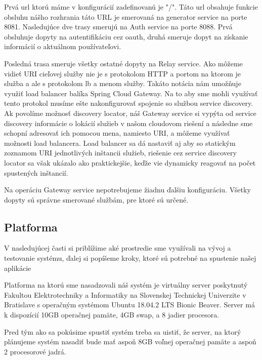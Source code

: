 Prvá \acrshort{url} ktorú máme v konfigurácií zadefinovanú je "/". Táto \acrshort{url} obsahuje funkcie obsluhu nášho rozhrania táto URL je smerovaná na generator service na porte 8081.
Nasledujúce dve trasy smerujú na Auth service na porte 8088. Prvá obsluhuje dopyty na autentifikáciu cez \acrshort{oauth}, druhá smeruje dopyt na získanie informácií o aktuálnom používateľovi.

Posledná trasa smeruje všetky ostatné dopyty na Relay service. Ako môžeme vidieť URI cieľovej služby nie je s protokolom HTTP a portom na ktorom je služba a ale s protokolom lb a menom služby. Takáto notácia nám umožňuje využiť load balancer balíka Spring Cloud Gateway. Na to aby sme mohli využívať tento protokol musíme ešte nakonfigurovať spojenie so službou service discovery. Ak povolíme možnosť discovery locator, náš Gateway service si vypýta od service discovery informácie o lokácií služieb v našom cloudovom riešení a následne sme schopní adresovať ich pomocou mena, namiesto URI, a môžeme využívať možnosti load balancera. Load balancer sa dá nastaviť aj aby so statickým zoznamom URI jednotlivých inštancii služieb, riešenie cez service discovery locator sa však ukázalo ako praktickejšie, keďže vie dynamicky reagovať na počet spustených inštancií.

Na operáciu Gateway service nepotrebujeme žiadnu ďalšiu konfiguráciu. Všetky dopyty sú správne smerované službám, pre ktoré sú určené.

\subsection{Platforma}
V nasledujúcej časti si priblížime aké prostredie sme využívali na vývoj a testovanie systému, ďalej si popíšeme kroky, ktoré sú potrebné na spustenie našej aplikácie

Platforma na ktorú sme nasadzovali náš systém je virtuálny server poskytnutý Fakultou Elektrotechniky a Informatiky na Slovenskej Technickej Univerzite v Bratislave s operačným systémom Ubuntu 18.04.2 LTS Bionic Beaver. Server má k dispozícií 10GB operačnej pamäte, 4GB swap, a 8 jadier procesora.

Pred tým ako sa pokúsime spustiť systém treba sa uistiť, že server, na ktorý plánujeme systém nasadiť bude mať aspoň 8GB voľnej operačnej pamäte a aspoň 2 procesorové jadrá.

